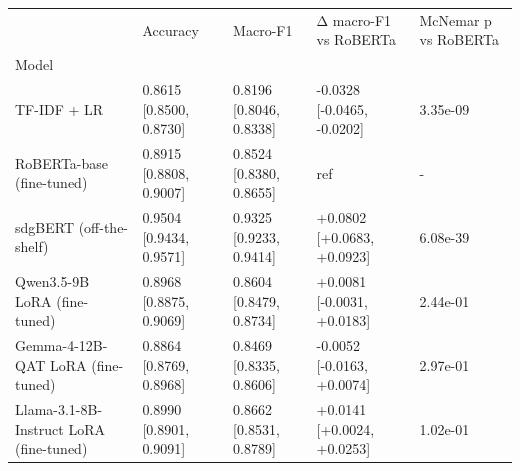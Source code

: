 \begin{tabular}{lllll}
\toprule
 & Accuracy & Macro-F1 & Δ macro-F1 vs RoBERTa & McNemar p vs RoBERTa \\
Model &  &  &  &  \\
\midrule
TF-IDF + LR & 0.8615 [0.8500, 0.8730] & 0.8196 [0.8046, 0.8338] & -0.0328 [-0.0465, -0.0202] & 3.35e-09 \\
RoBERTa-base (fine-tuned) & 0.8915 [0.8808, 0.9007] & 0.8524 [0.8380, 0.8655] & ref & - \\
sdgBERT (off-the-shelf) & 0.9504 [0.9434, 0.9571] & 0.9325 [0.9233, 0.9414] & +0.0802 [+0.0683, +0.0923] & 6.08e-39 \\
Qwen3.5-9B LoRA (fine-tuned) & 0.8968 [0.8875, 0.9069] & 0.8604 [0.8479, 0.8734] & +0.0081 [-0.0031, +0.0183] & 2.44e-01 \\
Gemma-4-12B-QAT LoRA (fine-tuned) & 0.8864 [0.8769, 0.8968] & 0.8469 [0.8335, 0.8606] & -0.0052 [-0.0163, +0.0074] & 2.97e-01 \\
Llama-3.1-8B-Instruct LoRA (fine-tuned) & 0.8990 [0.8901, 0.9091] & 0.8662 [0.8531, 0.8789] & +0.0141 [+0.0024, +0.0253] & 1.02e-01 \\
\bottomrule
\end{tabular}
